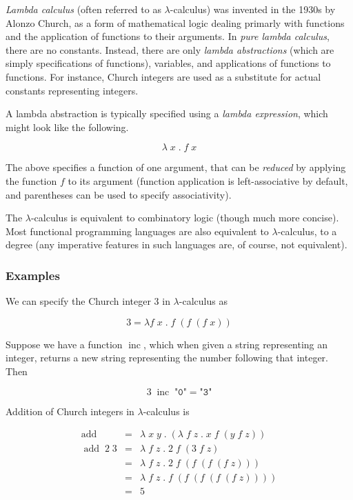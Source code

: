 \documentclass[12pt]{article}
\DeclareMathOperator{\inc}{inc}
\DeclareMathOperator{\add}{add}
\begin{document}
\emph{Lambda calculus} (often referred to as $\lambda$-calculus) was invented in the 1930s by Alonzo Church, as a form of mathematical logic dealing primarly with functions and the application of functions to their arguments.
In \emph{pure lambda calculus}, there are no constants.  Instead, there are only \emph{lambda abstractions} (which are simply specifications of functions), variables, and applications of functions to functions.  For instance, Church integers are used as a substitute for actual constants representing integers.

A lambda abstraction is typically specified using a \emph{lambda expression}, which might look like the following.

$$
\lambda\;x\;.\;f\;x
$$

The above specifies a function of one argument, that can be \emph{reduced} by applying the function $f$ to its argument (function application is left-associative by default, and parentheses can be used to specify associativity).

The $\lambda$-calculus is equivalent to combinatory logic (though much more concise).  Most functional programming languages are also equivalent to $\lambda$-calculus, to a degree (any imperative features in such languages are, of course, not equivalent).

\subsubsection*{Examples}

We can specify the Church integer $3$ in $\lambda$-calculus as

$$
3 = \lambda f\;x\;.\;f\;(f\;(f\;x))
$$

Suppose we have a function $\inc$, which when given a string representing an integer, returns a new string representing the number following that integer.
Then

$$
3\;\inc\;\texttt{"0"} = \texttt{"3"}
$$

Addition of Church integers in $\lambda$-calculus is

\begin{eqnarray*}
\add & = & \lambda\;x\;y\;.\;(\lambda\;f\;z\;.\;x\;f\;(y\;f\;z)) \\
\add\;2\;3 & = & \lambda\;f\; z\; .\; 2\; f\; (3\; f\; z) \\
        & = & \lambda\; f\; z\; .\; 2\; f\; (f\; (f\; (f\; z))) \\
        & = & \lambda\; f\; z\; .\; f\; (f\; (f\; (f\; (f\; z)))) \\
        & = & 5
\end{eqnarray*}
\end{document}
